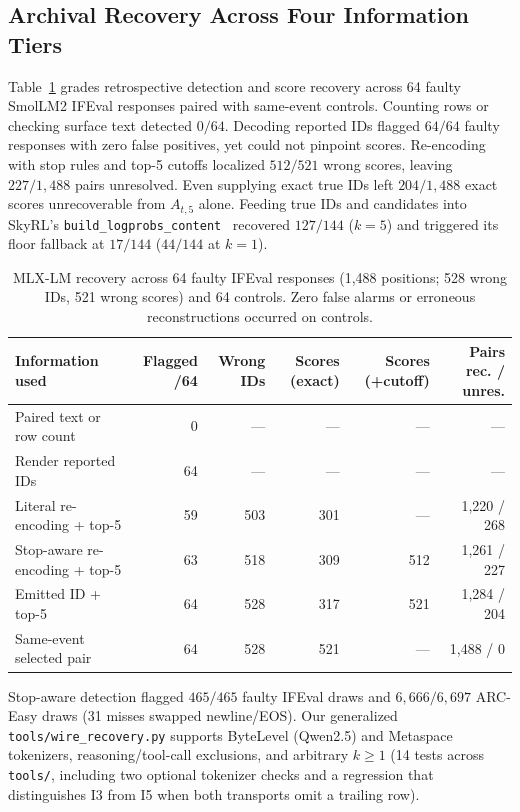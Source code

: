 \documentclass[11pt,letterpaper]{article}
\begin{document}
\subsection{Archival Recovery Across Four Information Tiers}
Table~\ref{tab:recover} grades retrospective detection and score recovery across 64 faulty SmolLM2 IFEval responses paired with same-event controls. Counting rows or checking surface text detected $0/64$. Decoding reported IDs flagged $64/64$ faulty responses with zero false positives, yet could not pinpoint scores. Re-encoding with stop rules and top-5 cutoffs localized $512/521$ wrong scores, leaving $227/1{,}488$ pairs unresolved. Even supplying exact true IDs left $204/1{,}488$ exact scores unrecoverable from $A_{t,5}$ alone. Feeding true IDs and candidates into SkyRL's \texttt{build\_logprobs\_content}~\cite{skyrl} recovered $127/144$ ($k=5$) and triggered its floor fallback at $17/144$ ($44/144$ at $k=1$).

\begin{table}[t]
\centering
\caption{MLX-LM recovery across 64 faulty IFEval responses (1,488 positions; 528 wrong IDs, 521 wrong scores) and 64 controls. Zero false alarms or erroneous reconstructions occurred on controls.}
\label{tab:recover}
\setlength{\tabcolsep}{5.5pt}
\footnotesize
\begin{tabular}{@{}lrrrrr@{}}\toprule
Information used & Flagged /64 & Wrong IDs & Scores (exact) & Scores (+cutoff) & Pairs rec. / unres.\\\midrule
Paired text or row count & 0 & --- & --- & --- & ---\\
Render reported IDs & 64 & --- & --- & --- & ---\\
Literal re-encoding + top-5 & 59 & 503 & 301 & --- & 1,220 / 268\\
Stop-aware re-encoding + top-5 & 63 & 518 & 309 & 512 & 1,261 / 227\\
Emitted ID + top-5 & 64 & 528 & 317 & 521 & 1,284 / 204\\
Same-event selected pair & 64 & 528 & 521 & --- & 1,488 / 0\\\bottomrule
\end{tabular}
\end{table}

Stop-aware detection flagged $465/465$ faulty IFEval draws and $6{,}666/6{,}697$ ARC-Easy draws (31 misses swapped newline/EOS). Our generalized \texttt{tools/wire\_recovery.py} supports ByteLevel (Qwen2.5) and Metaspace tokenizers, reasoning/tool-call exclusions, and arbitrary $k\ge 1$ (14 tests across \texttt{tools/}, including two optional tokenizer checks and a regression that distinguishes \textsc{I3} from \textsc{I5} when both transports omit a trailing row).
\end{document}
